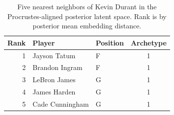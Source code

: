 \begin{table}[htbp]
  \centering\small
  \begin{tabular}{rllc}
    \toprule
    Rank & Player & Position & Archetype \\
    \midrule
    1 & Jayson Tatum & F & 1 \\
    2 & Brandon Ingram & F & 1 \\
    3 & LeBron James & G & 1 \\
    4 & James Harden & G & 1 \\
    5 & Cade Cunningham & G & 1 \\
    \bottomrule
  \end{tabular}
  \caption{Five nearest neighbors of Kevin Durant in the Procrustes-aligned posterior latent space. Rank is by posterior mean embedding distance.}
  \label{tab:Kevin_Durant_neighbors}
\end{table}

